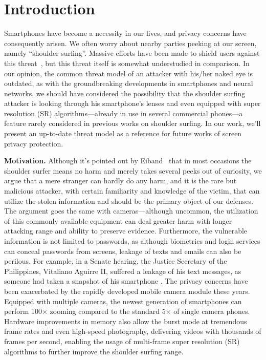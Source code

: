 \section{Introduction}
\label{sec-introduction}

Smartphones have become a necessity in our lives, and privacy concerns have consequently arisen. We often worry about nearby parties peeking at our screen, namely ``shoulder surfing''. Massive efforts have been made to shield users against this threat~\cite{wiedenbeck2006design,papadopoulos2017illusionpin,kumar2007reducing}, but this threat itself is somewhat understudied in comparison. In our opinion, the common threat model of an attacker with his/her naked eye is outdated, as with the groundbreaking developments in smartphones and neural networks, we should have considered the possibility that the shoulder surfing attacker is looking through his smartphone's lenses and even equipped with super resolution (SR) algorithms---already in use in several commercial phones---a feature rarely considered in previous works on shoulder surfing. In our work, we'll present an up-to-date threat model as a reference for future works of screen privacy protection.

\textbf{Motivation.} Although it's pointed out by Eiband~\cite{eiband2017understanding} that in most occasions the shoulder surfer means no harm and merely takes several peeks out of curiosity, we argue that a mere stranger can hardly do any harm, and it is the rare but malicious attacker, with certain familiarity and knowledge of the victim, that can utilize the stolen information and should be the primary object of our defenses.
The argument goes the same with cameras---although uncommon, the utilization of this commonly available equipment can deal greater harm with longer attacking range and ability to preserve evidence. Furthermore, the vulnerable information is not limited to passwords, as although biometrics and login services can conceal passwords from screens, leakage of texts and emails can also be perilous. For example, in a Senate hearing, the Justice Secretary of the Philippines, Vitaliano Aguirre II, suffered a leakage of his text messages, as someone had taken a snapshot of his smartphone \cite{Polotiko2017leakage}. 
The privacy concerns have been exacerbated by the rapidly developed mobile camera module these years. Equipped with multiple cameras, the newest generation of smartphones can perform 100$\times$ zooming compared to the standard 5$\times$ of single camera phones. Hardware improvements in memory also allow the burst mode at tremendous frame rates and even high-speed photography, delivering videos with thousands of frames per second, enabling the usage of multi-frame super resolution (SR) algorithms to further improve the shoulder surfing range.



